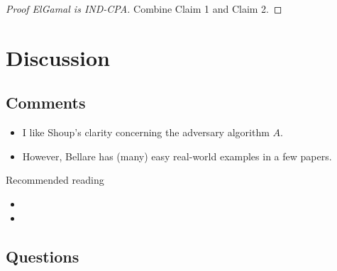 \begin{frame}
  \begin{proof}[Proof ElGamal is IND-CPA]
    Combine Claim 1 and Claim 2.
  \end{proof}
\end{frame}

%


\section{Discussion}

\subsection{Comments}

\begin{frame}
  \begin{itemize}
    \item I like Shoup's clarity concerning the adversary algorithm \(A\).
    \item However, Bellare has (many) easy real-world examples in a few papers.
  \end{itemize}
\end{frame}

\begin{frame}
  \begin{block}{Recommended reading}
    \begin{itemize}
      \item {}
      \item {}
    \end{itemize}
  \end{block}
\end{frame}

\subsection{Questions}

